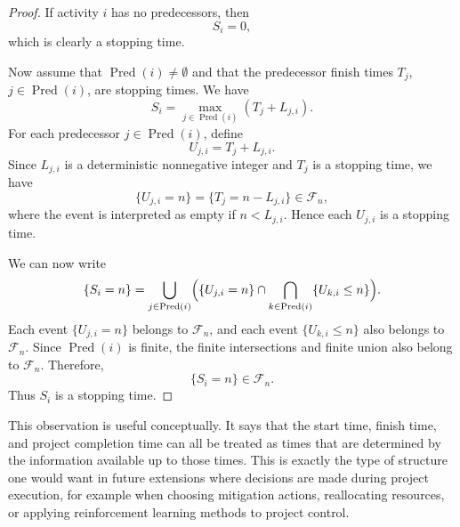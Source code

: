 \documentclass[11pt,a4paper]{article}
\newcommand{\cF}{\mathcal{F}}
\newcommand{\1}{\mathbf{1}}
\newcommand{\Pred}{\operatorname{Pred}}
\theoremstyle{definition}
\theoremstyle{plain}
\theoremstyle{remark}
\numberwithin{equation}{section}
\begin{document}
\begin{proof}
If activity $i$ has no predecessors, then
\[
S_i=0,
\]
which is clearly a stopping time.

Now assume that $\Pred(i)\neq\emptyset$ and that the predecessor finish times $T_j$, $j\in\Pred(i)$, are stopping times. We have
\[
S_i=\max_{j\in \Pred(i)}(T_j+L_{j,i}).
\]
For each predecessor $j\in\Pred(i)$, define
\[
U_{j,i}=T_j+L_{j,i}.
\]
Since $L_{j,i}$ is a deterministic nonnegative integer and $T_j$ is a stopping time, we have
\[
\{U_{j,i}=n\}
=
\{T_j=n-L_{j,i}\}
\in \cF_n,
\]
where the event is interpreted as empty if $n<L_{j,i}$. Hence each $U_{j,i}$ is a stopping time.

We can now write
\[
\{S_i=n\}
=
\bigcup_{j\in \Pred(i)}
\Bigl(
\{U_{j,i}=n\}
\cap
\bigcap_{k\in\Pred(i)}
\{U_{k,i}\leq n\}
\Bigr).
\]
Each event $\{U_{j,i}=n\}$ belongs to $\cF_n$, and each event $\{U_{k,i}\leq n\}$ also belongs to $\cF_n$. Since $\Pred(i)$ is finite, the finite intersections and finite union also belong to $\cF_n$. Therefore,
\[
\{S_i=n\}\in\cF_n.
\]
Thus $S_i$ is a stopping time.
\end{proof}

This observation is useful conceptually. It says that the start time, finish time, and project completion time can all be treated as times that are determined by the information available up to those times. This is exactly the type of structure one would want in future extensions where decisions are made during project execution, for example when choosing mitigation actions, reallocating resources, or applying reinforcement learning methods to project control.
\end{document}
